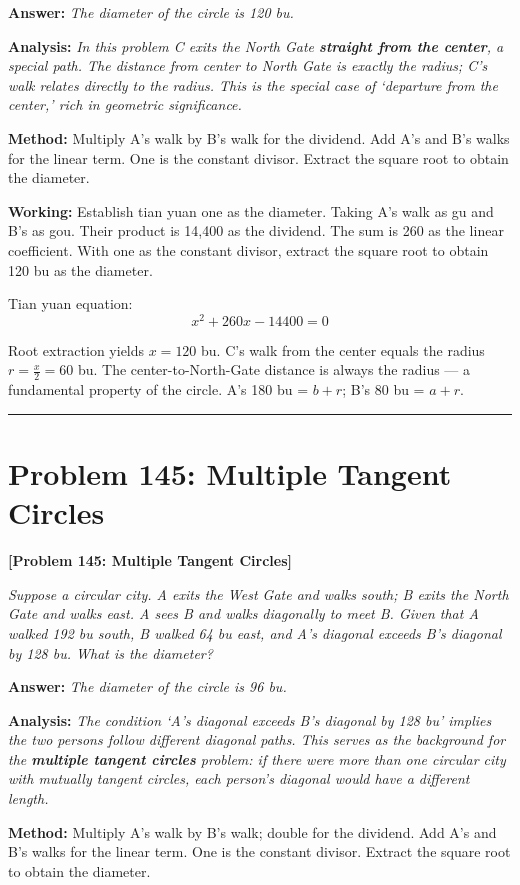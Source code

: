 \documentclass[11pt,a4paper]{book}
\newcommand{\answer}[1]{\noindent\textbf{\color{anacolor}Answer: }\textit{#1}\par}
\newcommand{\method}[1]{\noindent\textbf{\color{methodcolor}Method: }#1\par}
\newcommand{\working}[1]{\noindent\textbf{\color{workcolor}Working: }#1\par}
\newcommand{\analysis}[1]{\noindent\textbf{\color{anacolor}Analysis: }\textit{#1}\par}
\newcommand{\shortline}{\noindent\rule{0.5\textwidth}{0.4pt}\par}
\begin{document}
\answer{The diameter of the circle is 120 bu.}

\analysis{In this problem C exits the North Gate \textbf{straight from the center}, a special path. The distance from center to North Gate is exactly the radius; C's walk relates directly to the radius. This is the special case of `departure from the center,' rich in geometric significance.}

\method{Multiply A's walk by B's walk for the dividend. Add A's and B's walks for the linear term. One is the constant divisor. Extract the square root to obtain the diameter.}

\working{Establish tian yuan one as the diameter. Taking A's walk as gu and B's as gou. Their product is 14,400 as the dividend. The sum is 260 as the linear coefficient. With one as the constant divisor, extract the square root to obtain 120 bu as the diameter.

Tian yuan equation:
$$x^2 + 260x - 14400 = 0$$

Root extraction yields $x = 120$ bu. C's walk from the center equals the radius $r = \frac{x}{2} = 60$ bu. The center-to-North-Gate distance is always the radius --- a fundamental property of the circle. A's 180 bu = $b + r$; B's 80 bu = $a + r$.}

\shortline

\section{Problem 145: Multiple Tangent Circles}
\label{sec:prob145}

\noindent\textbf{\color{probcolor}[Problem 145: Multiple Tangent Circles]}

\textit{Suppose a circular city. A exits the West Gate and walks south; B exits the North Gate and walks east. A sees B and walks diagonally to meet B. Given that A walked 192 bu south, B walked 64 bu east, and A's diagonal exceeds B's diagonal by 128 bu. What is the diameter?}

\answer{The diameter of the circle is 96 bu.}

\analysis{The condition `A's diagonal exceeds B's diagonal by 128 bu' implies the two persons follow different diagonal paths. This serves as the background for the \textbf{multiple tangent circles} problem: if there were more than one circular city with mutually tangent circles, each person's diagonal would have a different length.}

\method{Multiply A's walk by B's walk; double for the dividend. Add A's and B's walks for the linear term. One is the constant divisor. Extract the square root to obtain the diameter.}
\end{document}
